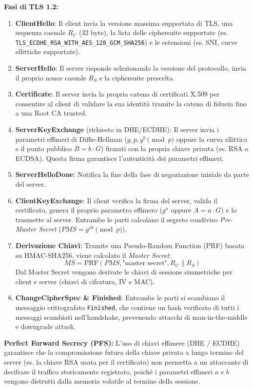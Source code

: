 \documentclass[11pt,a4paper]{article}
\begin{document}
\begin{solutionbox}
\textbf{Fasi di TLS 1.2:}
\begin{enumerate}
    \item \textbf{ClientHello}: Il client invia la versione massima supportata di TLS, una sequenza casuale $R_C$ (32 byte), la lista delle ciphersuite supportate (es. \texttt{TLS\_ECDHE\_RSA\_WITH\_AES\_128\_GCM\_SHA256}) e le estensioni (es. SNI, curve ellittiche supportate).
    \item \textbf{ServerHello}: Il server risponde selezionando la versione del protocollo, invia il proprio nonce casuale $R_S$ e la ciphersuite prescelta.
    \item \textbf{Certificate}: Il server invia la propria catena di certificati X.509 per consentire al client di validare la sua identit\`a tramite la catena di fiducia fino a una Root CA trusted.
    \item \textbf{ServerKeyExchange} (richiesto in DHE/ECDHE): Il server invia i parametri effimeri di Diffie-Hellman ($g, p, g^b \pmod p$ oppure la curva ellittica e il punto pubblico $B = b \cdot G$) firmati con la propria chiave privata (es. RSA o ECDSA). Questa firma garantisce l'autenticit\`a dei parametri effimeri.
    \item \textbf{ServerHelloDone}: Notifica la fine della fase di negoziazione iniziale da parte del server.
    \item \textbf{ClientKeyExchange}: Il client verifica la firma del server, valida il certificato, genera il proprio parametro effimero ($g^a$ oppure $A = a \cdot G$) e lo trasmette al server. Entrambe le parti calcolano il segreto condiviso \textit{Pre-Master Secret} ($PMS = g^{ab} \pmod p$).
    \item \textbf{Derivazione Chiavi}: Tramite una Pseudo-Random Function (PRF) basata su HMAC-SHA256, viene calcolato il \textit{Master Secret}:
    \[
    MS = \text{PRF}(PMS, \text{"master secret"}, R_C \parallel R_S)
    \]
    Dal Master Secret vengono derivate le chiavi di sessione simmetriche per client e server (chiavi di cifratura, IV e MAC).
    \item \textbf{ChangeCipherSpec \& Finished}: Entrambe le parti si scambiano il messaggio crittografato \texttt{Finished}, che contiene un hash verificato di tutti i messaggi scambiati nell'handshake, prevenendo attacchi di man-in-the-middle e downgrade attack.
\end{enumerate}

\textbf{Perfect Forward Secrecy (PFS):}
L'uso di chiavi effimere (DHE / ECDHE) garantisce che la compromissione futura della chiave privata a lungo termine del server (es. la chiave RSA usata per il certificato) non permetta a un attaccante di decifrare il traffico storicamente registrato, poich\'e i parametri effimeri $a$ e $b$ vengono distrutti dalla memoria volatile al termine della sessione.


\end{solutionbox}
\end{document}
